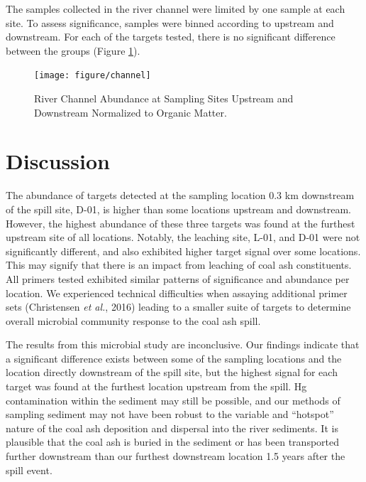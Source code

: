 \documentclass[ms, hidelinks]{uncgdissertationexp}
\theoremstyle{plain}
\theoremstyle{definition}
\theoremstyle{remark}
\begin{document}
The samples collected in the river channel were limited by one sample at each site. To assess significance, samples were binned according to upstream and downstream. For each of the targets tested, there is no significant difference between the groups (Figure \ref{fig:channel}).

\begin{figure}[htbp]
  \texttt{[image: figure/channel]}
  \caption[River Channel Abundance at Sampling Sites Upstream and Downstream Normalized to Organic Matter.]{River Channel Abundance at Sampling Sites Upstream and Downstream Normalized to Organic Matter.}\label{fig:channel}
\end{figure}
\hypertarget{discussion}{%
\section{Discussion}\label{discussion}}

The abundance of targets detected at the sampling location 0.3 km downstream of the spill site, D-01, is higher than some locations upstream and downstream. However, the highest abundance of these three targets was found at the furthest upstream site of all locations. Notably, the leaching site, L-01, and D-01 were not significantly different, and also exhibited higher target signal over some locations. This may signify that there is an impact from leaching of coal ash constituents. All primers tested exhibited similar patterns of significance and abundance per location. We experienced technical difficulties when assaying additional primer sets (Christensen \emph{et al.}, 2016)
leading to a smaller suite of targets to determine overall microbial community response to the coal ash spill.

The results from this microbial study are inconclusive. Our findings indicate that a significant difference exists between some of the sampling locations and the location directly downstream of the spill site, but the highest signal for each target was found at the furthest location upstream from the spill. Hg contamination within the sediment may still be possible, and our methods of sampling sediment may not have been robust to the variable and ``hotspot'' nature of the coal ash deposition and dispersal into the river sediments. It is plausible that the coal ash is buried in the sediment or has been transported further downstream than our furthest downstream location 1.5 years after the spill event.
\end{document}
